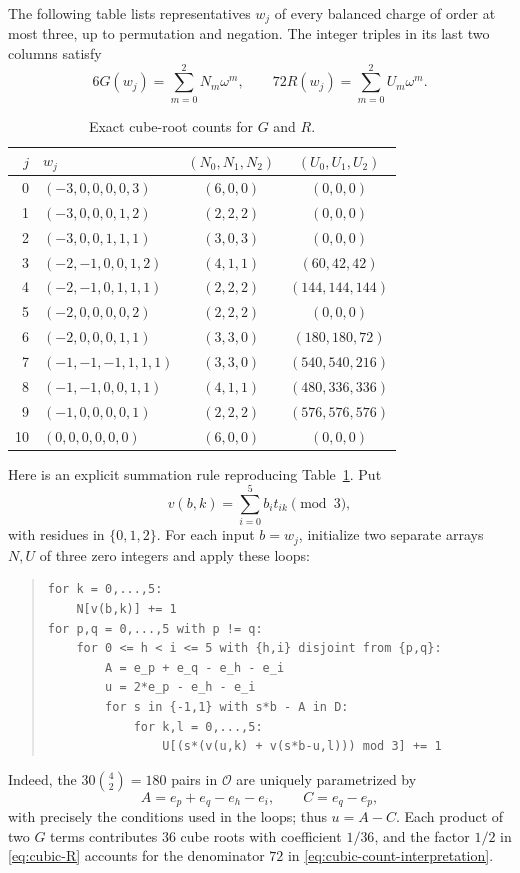 The following table lists representatives $w_j$ of every balanced
charge of order at most three, up to permutation and negation. The
integer triples in its last two columns satisfy
\begin{equation}\label{eq:cubic-count-interpretation}
 6G(w_j)=\sum_{m=0}^2N_m\omega^m,
 \qquad
 72R(w_j)=\sum_{m=0}^2U_m\omega^m.
\end{equation}
\begin{table}[htbp]
\centering
\small
\begin{tabular}{@{}rlcc@{}}
\toprule
$j$&$w_j$&$(N_0,N_1,N_2)$&$(U_0,U_1,U_2)$\\
\midrule
0&$(-3,0,0,0,0,3)$&$(6,0,0)$&$(0,0,0)$\\
1&$(-3,0,0,0,1,2)$&$(2,2,2)$&$(0,0,0)$\\
2&$(-3,0,0,1,1,1)$&$(3,0,3)$&$(0,0,0)$\\
3&$(-2,-1,0,0,1,2)$&$(4,1,1)$&$(60,42,42)$\\
4&$(-2,-1,0,1,1,1)$&$(2,2,2)$&$(144,144,144)$\\
5&$(-2,0,0,0,0,2)$&$(2,2,2)$&$(0,0,0)$\\
6&$(-2,0,0,0,1,1)$&$(3,3,0)$&$(180,180,72)$\\
7&$(-1,-1,-1,1,1,1)$&$(3,3,0)$&$(540,540,216)$\\
8&$(-1,-1,0,0,1,1)$&$(4,1,1)$&$(480,336,336)$\\
9&$(-1,0,0,0,0,1)$&$(2,2,2)$&$(576,576,576)$\\
10&$(0,0,0,0,0,0)$&$(6,0,0)$&$(0,0,0)$\\
\bottomrule
\end{tabular}
\caption{Exact cube-root counts for $G$ and $R$.}
\label{tab:cubic-counts}
\end{table}

Here is an explicit summation rule reproducing
Table~\ref{tab:cubic-counts}. Put
\[
 v(b,k)=\sum_{i=0}^5 b_i t_{ik}\pmod3,
\]
with residues in $\{0,1,2\}$. For each input $b=w_j$, initialize two
separate arrays $N,U$ of three zero integers and apply these loops:
\begin{quote}
\begin{verbatim}
for k = 0,...,5:
    N[v(b,k)] += 1
for p,q = 0,...,5 with p != q:
    for 0 <= h < i <= 5 with {h,i} disjoint from {p,q}:
        A = e_p + e_q - e_h - e_i
        u = 2*e_p - e_h - e_i
        for s in {-1,1} with s*b - A in D:
            for k,l = 0,...,5:
                U[(s*(v(u,k) + v(s*b-u,l))) mod 3] += 1
\end{verbatim}
\end{quote}
Indeed, the $30\binom42=180$ pairs in $\mathcal O$ are uniquely
parametrized by
\[
 A=e_p+e_q-e_h-e_i,\qquad C=e_q-e_p,
\]
with precisely the conditions used in the loops; thus $u=A-C$.
Each product of two $G$ terms contributes $36$ cube roots with
coefficient $1/36$, and the factor $1/2$ in
\eqref{eq:cubic-R} accounts for the denominator $72$ in
\eqref{eq:cubic-count-interpretation}.

